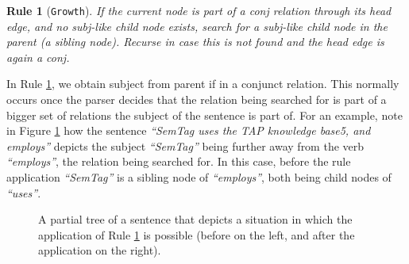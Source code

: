 \documentclass[11pt,a4paper,openright]{memoir}
\newtheorem{treerule}{Rule}
\begin{document}
\begin{treerule}[\texttt{Growth}]
\label{treerule:rule2}
If the current node is part of a \emph{conj} relation through its head edge, and no \emph{subj}-like child node exists, search for a \emph{subj}-like child node in the parent (a sibling node). Recurse in case this is not found and the head edge is again a \emph{conj}.
\end{treerule}

In Rule \ref{treerule:rule2}, we obtain subject from parent if in a conjunct relation. This normally occurs once the parser decides that the relation being searched for is part of a bigger set of relations the subject of the sentence is part of. For an example, note in Figure \ref{fig:rule2_before_after} how the sentence \emph{\enquote{SemTag uses the TAP knowledge base5, and employs}} depicts the subject \emph{\enquote{SemTag}} being further away from the verb \emph{\enquote{employs}}, the relation being searched for. In this case, before the rule application \emph{\enquote{SemTag}} is a sibling node of \emph{\enquote{employs}}, both being child nodes of \emph{\enquote{uses}}.


\begin{figure}[!htbp]
\centering

\begin{minipage}{.5\textwidth}
\centering
{}

\end{minipage}%
\begin{minipage}{.5\textwidth}
\centering
{}

\end{minipage}

\caption[A partial tree of a sentence that depicts a tree in which the application of Rule \ref{treerule:rule2} is possible (before).]{A partial tree of a sentence that depicts a situation in which the application of Rule \ref{treerule:rule2} is possible (before on the left, and after the application on the right).}
\label{fig:rule2_before_after}
\end{figure}
\end{document}
